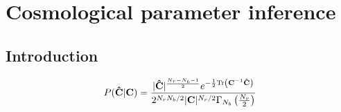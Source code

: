 
\chapter{Cosmological parameter inference}
\lhead[\fancyplain{}{\thepage}]{\fancyplain{}{\rightmark}}
 \thispagestyle{plain}
\setlength{\parindent}{10mm}


\section{Introduction}

\begin{equation}
\label{5:wishart-pdf}
P(\mathbf{\hat{C}}\vert \mathbf{C}) = \frac{\vert\mathbf{\hat{C}}\vert^{\frac{N_r-N_b-1}{2}}e^{-\frac{1}{2}{\rm Tr}\left(\mathbf{C}^{-1}\mathbf{\hat{C}}\right)}}{2^{N_rN_b/2}\vert \mathbf{C}\vert^{N_r/2}\Gamma_{N_b}\left(\frac{N_r}{2}\right)}
\end{equation}

%